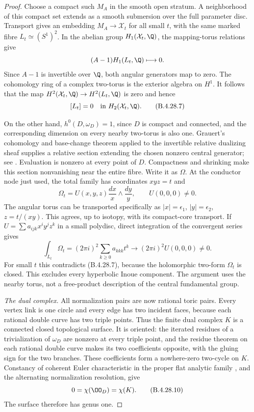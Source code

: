 \begin{proof}
Choose a compact such $M_A$ in the smooth open stratum.
A neighborhood of this compact set extends as a
smooth submersion over the full parameter disc.
Transport gives an embedding $M_A\to\mathcal X_t$ for
all small $t$, with the same marked fibre $L_t\simeq
(S^1)^2$. In the abelian group
$H_1(\mathcal X_t,\Q)$, the mapping-torus relations give
\[
 (A-1)H_1(L_t,\Q)\longmapsto0.
\]
Since $A-1$ is invertible over $\Q$, both angular
generators map to zero. The cohomology ring of a
complex two-torus is the exterior algebra on $H^1$.
It follows that the map $H^2(\mathcal X_t,\Q)\to
H^2(L_t,\Q)$ is zero and hence
\[
 [L_t]=0\quad\hbox{in }H_2(\mathcal X_t,\Q).           \tag{B.4.28.7}
\]

On the other hand, $h^0(D,\omega_D)=1$, since $D$ is
compact and connected, and the corresponding dimension
on every nearby two-torus is also one. Grauert's
cohomology and base-change theorem applied to the
invertible relative dualizing sheaf supplies a relative
section extending the chosen nonzero central generator;
see \citet[Chapter III, Theorem 4.12(ii)]{BS76push}.
Evaluation is
nonzero at every point of $D$. Compactness and shrinking
make this section nonvanishing near the entire fibre.
Write it as $\Omega$. At the conductor node just used,
the total family has coordinates $xyz=t$ and
\[
 \Omega_t=U(x,y,z)\frac{dx}{x}\wedge\frac{dy}{y},
 \qquad U(0,0,0)\ne0.                                \tag{B.4.28.8}
\]
The angular torus can be transported specifically as
$|x|=\epsilon_1$, $|y|=\epsilon_2$, $z=t/(xy)$.
This agrees, up to isotopy, with its compact-core
transport. If $U=\sum a_{ijk}x^iy^jz^k$ in a small
polydisc, direct integration of the convergent series
gives
\[
 \int_{L_t}\Omega_t
   =(2\pi i)^2\sum_{k\ge0}a_{kkk}t^k
   \longrightarrow(2\pi i)^2U(0,0,0)\ne0.            \tag{B.4.28.9}
\]
For small $t$ this contradicts (B.4.28.7), because
the holomorphic two-form $\Omega_t$ is closed. This
excludes every hyperbolic Inoue component. The
argument uses the nearby torus, not a free-product
description of the central fundamental group.

\emph{The dual complex.}
All normalization pairs are now rational toric pairs.
Every vertex link is one circle and every edge has
two incident faces, because each rational double
curve has two triple points. Thus the finite dual
complex $K$ is a connected closed topological surface.
It is oriented: the iterated residues of a
trivialization of $\omega_D$ are nonzero at every
triple point, and the residue theorem on each rational
double curve makes its two coefficients opposite,
with the gluing sign for the two branches. These
coefficients form a nowhere-zero two-cycle on $K$.
Constancy of coherent Euler characteristic in the
proper flat analytic family
\citep[Chapter III, Theorem 4.12(iii)]{BS76push}, and the alternating
normalization resolution, give
\[
 0=\chi(\OO_D)=\chi(K).                              \tag{B.4.28.10}
\]
The surface therefore has genus one.


\end{proof}
